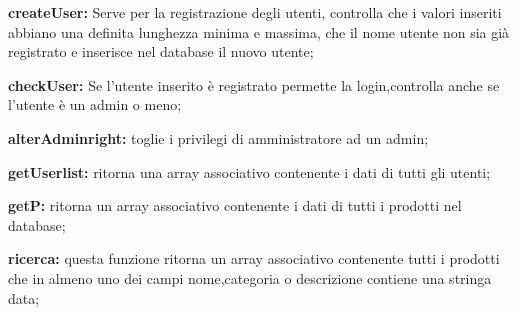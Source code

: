 \begin{*nome-ambiente*}
	\item \textbf{createUser:} Serve per la registrazione degli utenti, controlla che i valori inseriti abbiano una definita lunghezza minima e massima, che il nome utente non sia già registrato e inserisce nel database il nuovo utente;
	\item \textbf{checkUser:} Se l'utente inserito è registrato permette la login,controlla anche se l'utente è un admin o meno;
	\item \textbf{alterAdminright:} toglie i privilegi di amministratore ad un admin;
	\item \textbf{getUserlist:} ritorna una array associativo contenente i dati di tutti gli utenti;
	\item \textbf{getP:} ritorna un array associativo contenente i dati di tutti i prodotti nel database;
	\item \textbf{ricerca:} questa funzione ritorna un array associativo contenente tutti i prodotti che in almeno uno dei campi nome,categoria o descrizione contiene una stringa data; 
	\item
	\item
	\item
	\item
\end{*nome-ambiente*}

